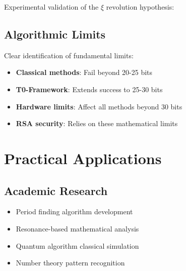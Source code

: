 	Experimental validation of the $\xi$ revolution hypothesis:
	
	\begin{table}[H]
		\centering
		\caption{$\xi$-Strategy Effectiveness}
	\end{table}
	
	\subsection{Algorithmic Limits}
	
	Clear identification of fundamental limits:
	\begin{itemize}
		\item \textbf{Classical methods}: Fail beyond 20-25 bits
		\item \textbf{T0-Framework}: Extends success to 25-30 bits
		\item \textbf{Hardware limits}: Affect all methods beyond 30 bits
		\item \textbf{RSA security}: Relies on these mathematical limits
	\end{itemize}
	
	\section{Practical Applications}
	
	\subsection{Academic Research}
	\begin{itemize}
		\item Period finding algorithm development
		\item Resonance-based mathematical analysis
		\item Quantum algorithm classical simulation
		\item Number theory pattern recognition
	\end{itemize}
	
